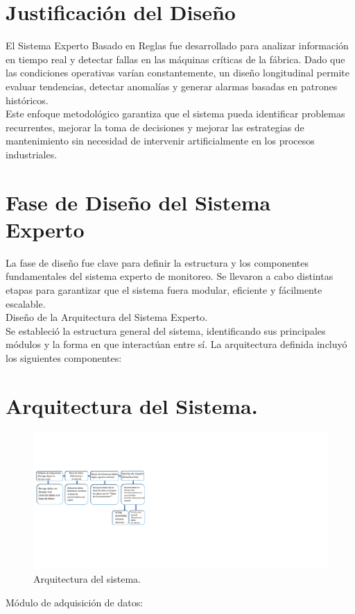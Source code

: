 \section{Justificación del Diseño}
El Sistema Experto Basado en Reglas fue desarrollado para analizar información en tiempo real y detectar fallas en las máquinas críticas de la fábrica. Dado que las condiciones operativas varían constantemente, un diseño longitudinal permite evaluar tendencias, detectar anomalías y generar alarmas basadas en patrones históricos. \\
Este enfoque metodológico garantiza que el sistema pueda identificar problemas recurrentes, mejorar la toma de decisiones y mejorar las estrategias de mantenimiento sin necesidad de intervenir artificialmente en los procesos industriales. \\

\section{Fase de Diseño del Sistema Experto}
La fase de diseño fue clave para definir la estructura y los componentes fundamentales del sistema experto de monitoreo. Se llevaron a cabo distintas etapas para garantizar que el sistema fuera modular, eficiente y fácilmente escalable. \\
Diseño de la Arquitectura del Sistema Experto. \\
Se estableció la estructura general del sistema, identificando sus principales módulos y la forma en que interactúan entre sí. La arquitectura definida incluyó los siguientes componentes:

\section{Arquitectura del Sistema.} 

\begin{figure}[H]
    \begin{center}
    \includegraphics[scale = 1.0]{./images/Arquitectura del sistema experto.png}
    \caption{Arquitectura del sistema.}
    \label{fig:huella}
    \end{center}
    \end{figure}
Módulo de adquisición de datos: \\

